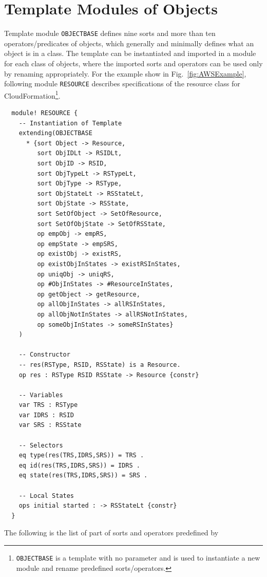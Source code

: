 \documentclass[12pt]{report}
\begin{document}
\section{Template Modules of Objects}
\label{sec:objectbase}
Template module {\tt OBJECTBASE} defines nine sorts and more than ten
operators/predicates of objects, which generally and minimally defines
what an object is in a class. The template can be instantiated and
imported in a module for each class of objects, where the imported
sorts and operators can be used only by renaming appropriately. For
the example show in Fig.~\ref{fig:AWSExample}, following module
{\tt RESOURCE} describes specifications of the resource class for
CloudFormation\footnote{{\tt OBJECTBASE} is a template with no
  parameter and is used to instantiate a new module and rename
  predefined sorts/operators.}.
\small
\begin{verbatim}
  module! RESOURCE {
    -- Instantiation of Template
    extending(OBJECTBASE
      * {sort Object -> Resource,
         sort ObjIDLt -> RSIDLt,
         sort ObjID -> RSID,
         sort ObjTypeLt -> RSTypeLt,
         sort ObjType -> RSType,
         sort ObjStateLt -> RSStateLt,
         sort ObjState -> RSState,
         sort SetOfObject -> SetOfResource,
         sort SetOfObjState -> SetOfRSState,
         op empObj -> empRS,
         op empState -> empSRS,
         op existObj -> existRS,
         op existObjInStates -> existRSInStates,
         op uniqObj -> uniqRS,
         op #ObjInStates -> #ResourceInStates,
         op getObject -> getResource,
         op allObjInStates -> allRSInStates,
         op allObjNotInStates -> allRSNotInStates,
         op someObjInStates -> someRSInStates}
    )
  
    -- Constructor
    -- res(RSType, RSID, RSState) is a Resource.
    op res : RSType RSID RSState -> Resource {constr}
  
    -- Variables
    var TRS : RSType
    var IDRS : RSID
    var SRS : RSState
  
    -- Selectors
    eq type(res(TRS,IDRS,SRS)) = TRS .
    eq id(res(TRS,IDRS,SRS)) = IDRS .
    eq state(res(TRS,IDRS,SRS)) = SRS .
  
    -- Local States
    ops initial started : -> RSStateLt {constr}
  }
\end{verbatim}
\normalsize
The following is the list of part of sorts and operators predefined by
\end{document}
